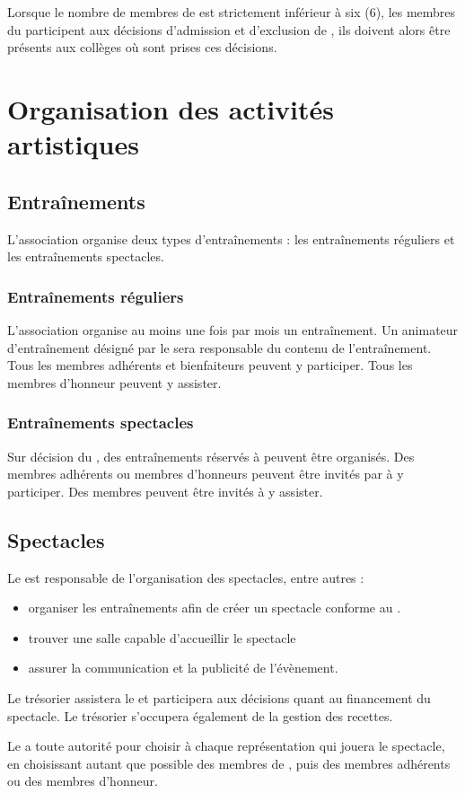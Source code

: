 \documentclass[a4paper,french,10pt]{article}
\newcommand{\article}[1]{\subsection{#1}\addtocounter{article}{1}}
\newcounter{article}
\begin{document}
Lorsque le nombre de membres de \troupe{} est strictement inférieur à six (6), les membres du \bureau{} participent aux décisions d'admission et d'exclusion de \troupe{}, ils doivent alors être présents aux collèges où sont prises ces décisions.

\section{Organisation des activités artistiques}
\article{Entraînements}
\label{sec:entrainements}
L'association organise deux types d'entraînements : les entraînements réguliers et les entraînements spectacles.

\subsubsection*{Entraînements réguliers}
L'association organise au moins une fois par mois un entraînement. Un animateur d'entraînement désigné par le \DA{} sera responsable du contenu de l'entraînement. Tous les membres adhérents et bienfaiteurs peuvent y participer. Tous les membres d'honneur peuvent y assister.

\subsubsection*{Entraînements spectacles}
Sur décision du \DA{}, des entraînements réservés à \troupe{} peuvent être organisés. Des membres adhérents ou membres d'honneurs peuvent être invités par \troupe{} à y participer. Des membres peuvent être invités à y assister.

\article{Spectacles}
\label{sec:spectacles}
Le \DA{} est responsable de l'organisation des spectacles, entre autres :
\begin{itemize}
\item organiser les entraînements afin de créer un spectacle conforme au \PA{}.
\item trouver une salle capable d'accueillir le spectacle
\item assurer la communication et la publicité de l'évènement.
\end{itemize}

Le trésorier assistera le \DA{} et participera aux décisions quant au financement du spectacle. Le trésorier s'occupera également de la gestion des recettes.

Le \DA{} a toute autorité pour choisir à chaque représentation qui jouera le spectacle, en choisissant autant que possible des membres de \troupe{}, puis des membres adhérents ou des membres d'honneur.
\end{document}
